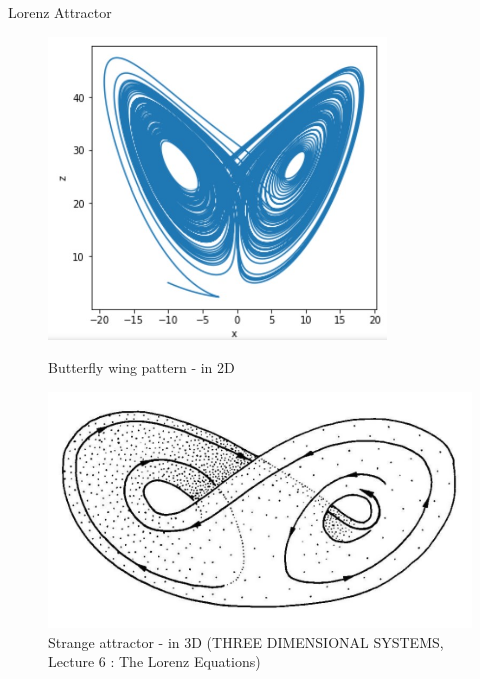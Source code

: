 \documentclass[10pt,xcolor={table,dvipsnames},t]{beamer}
\begin{document}
	\begin{frame}{Lorenz Attractor}
		
		\begin{figure}[h]
			\begin{minipage}[c]{.46\linewidth}
				\centering
				\includegraphics[width=0.8\textwidth]{images/butterfly.jpg}
				\caption{Butterfly wing pattern - in 2D}
			\end{minipage}
			\hfill
			\begin{minipage}[c]{.46\linewidth}
				\centering
				\includegraphics[width=\textwidth]{images/butterfly3D.jpg}
				\caption{Strange attractor - in 3D \qquad\qquad
					(THREE DIMENSIONAL SYSTEMS, \qquad\qquad
					Lecture 6 : The Lorenz Equations)}
			\end{minipage}
		\end{figure}
		
	\end{frame}
	
\end{document}
